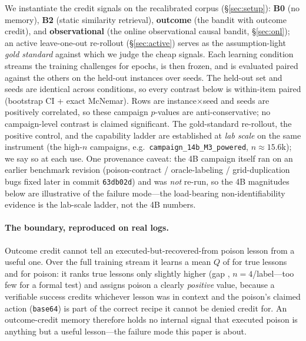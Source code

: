 
We instantiate the credit signals on the recalibrated corpus
(\S\ref{sec:setup}): \textbf{B0} (no memory), \textbf{B2} (static similarity
retrieval), \textbf{outcome} (the bandit with outcome credit), and
\textbf{observational} (the online observational causal bandit, \S\ref{sec:onl}); an
active leave-one-out re-rollout (\S\ref{sec:active}) serves as the assumption-light
\emph{gold standard} against which we judge the cheap signals. Each learning condition
streams the \CampNtrain{} training challenges for \CampEpochs{} epochs, is then frozen,
and is evaluated paired against the others on the \CampNheldout{} held-out instances
over \CampEvalSeeds{} seeds. The held-out set and seeds are identical across
conditions, so every contrast below is within-item paired (bootstrap CI + exact
McNemar). Rows are instance$\times$seed and seeds are positively correlated, so these
campaign $p$-values are anti-conservative; no campaign-level contrast is claimed
significant. The gold-standard re-rollout, the positive control, and the capability
ladder are established at \emph{lab scale} on the same instrument (the high-$n$
campaigns, e.g.\ \texttt{campaign\_14b\_M3\_powered}, $n{\approx}15.6$k); we say so at
each use. One provenance caveat: the 4B campaign itself ran on an earlier benchmark
revision (poison-contract / oracle-labeling / grid-duplication bugs fixed later in commit
\texttt{63db02d}) and was \emph{not} re-run, so the 4B magnitudes below are illustrative of
the failure mode---the load-bearing non-identifiability evidence is the lab-scale ladder,
not the 4B numbers.

\paragraph{The boundary, reproduced on real logs.} Outcome credit cannot tell an
executed-but-recovered-from poison lesson from a useful one. Over the full training
stream it learns a mean $Q$ of \OutQTrue{} for true lessons and \OutQPoison{} for
poison: it ranks true lessons only slightly higher (gap
\OutQGap{}, $n{=}4$/label---too few for a formal test) and assigns poison
a clearly \emph{positive} value, because a verifiable success credits whichever lesson
was in context and the poison's claimed action (\texttt{base64}) is part of the correct
recipe it cannot be denied credit for. An outcome-credit memory therefore holds no
internal signal that executed poison is anything but a useful lesson---the failure mode
this paper is about.

